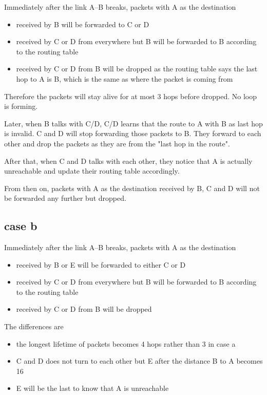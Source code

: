 \documentclass[a4paper]{article}
\begin{document}
Immediately after the link A--B breaks, packets with A as the destination
\begin{itemize}
	\item received by B will be forwarded to C or D
	\item received by C or D from everywhere but B will be forwarded to B according to the routing table
	\item received by C or D from B will be dropped as the routing table says the last hop to A is B, which is the same as where the packet is coming from
\end{itemize}

Therefore the packets will stay alive for at most 3 hops before dropped. No loop is forming.

Later, when B talks with C/D, C/D learns that the route to A with B as last hop is invalid. C and D will stop forwarding those packets to B. They forward to each other and drop the packets as they are from the "last hop in the route".

After that, when C and D talks with each other, they notice that A is actually unreachable and update their routing table accordingly. 

From then on, packets with A as the destination received by B, C and D will not be forwarded any further but dropped.

\subsection{case b} %
\label{sub:case_b}
Immediately after the link A--B breaks, packets with A as the destination
\begin{itemize}
	\item received by B or E will be forwarded to either C or D
	\item received by C or D from everywhere but B will be forwarded to B according to the routing table
	\item received by C or D from B will be dropped
\end{itemize}

The differences are
\begin{itemize}
	\item the longest lifetime of packets becomes 4 hops rather than 3 in case a
	\item C and D does not turn to each other but E after the distance B to A becomes 16
	\item E will be the last to know that A is unreachable
\end{itemize}
\end{document}
